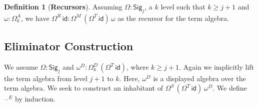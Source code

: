 \documentclass[12pt,a4paper,twoside,openany]{book}
\theoremstyle{remark}
\theoremstyle{definition}
\newtheorem{mydefinition}{Definition}
\theoremstyle{theorem}
\newcommand{\id}{\mathsf{id}}
\newcommand{\blank}{\mathord{\hspace{1pt}\text{--}\hspace{1pt}}}
\newcommand{\Sig}{\mathsf{Sig}}
\begin{document}
\begin{mydefinition}[\textbf{Recursors}]
Assuming $\Omega : \Sig_j$, a $k$ level such that $k \geq j + 1$ and $\omega :
\Omega^A_{k}$, we have $\Omega^R\,\id : \Omega^M\,(\Omega^T\,\id)\,\omega$ as
the recursor for the term algebra.
\end{mydefinition}

\subsection{Eliminator Construction}

We assume $\Omega : \Sig_j$ and $\omega^D : \Omega^D_{k}\,(\Omega^T\,\id)$,
where $k \geq j + 1$. Again we implicitly lift the term algebra from level $j+1$
to $k$. Here, $\omega^D$ is a displayed algebra over the term algebra. We seek
to construct an inhabitant of $\Omega^S\,(\Omega^T\,\id)\,\omega^D$. We define
$\blank^E$ by induction.
\end{document}
